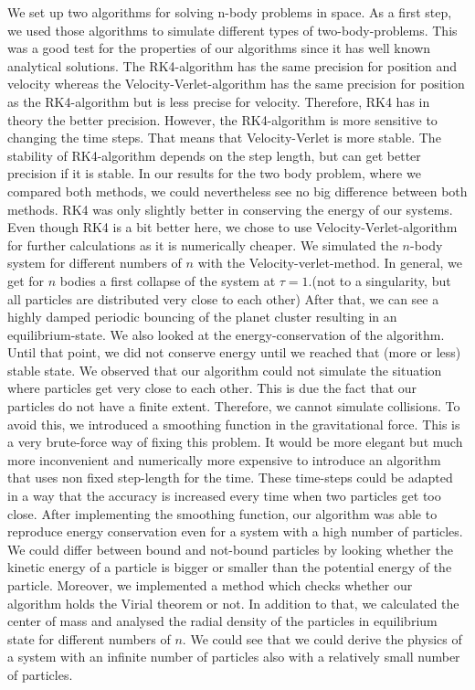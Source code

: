 \documentclass[10pt,a4paper]{article}
\begin{document}
We set up two algorithms for solving n-body problems in space. As a first step, we used those algorithms to simulate different types of two-body-problems. This was a good test for the properties of our algorithms since it has well known analytical solutions. 
The RK4-algorithm has the same precision for position and velocity whereas the Velocity-Verlet-algorithm has the same precision for position as the RK4-algorithm but is less precise for velocity. Therefore, RK4 has in theory the better precision. However, the RK4-algorithm is more sensitive to changing the time steps. That means that Velocity-Verlet is more stable. The stability of RK4-algorithm depends on the step length, but can get better precision if it is stable. In our results for the two body problem, where we compared both methods, we could nevertheless see no big difference between both methods. RK4 was only slightly better in conserving the energy of our systems.
Even though RK4 is a bit better here, we chose to use Velocity-Verlet-algorithm for further calculations as it is numerically cheaper. 
We simulated the $n$-body system for different numbers of $n$ with the Velocity-verlet-method. 
In general, we get for $n$ bodies a first collapse of the system at $\tau=1$.(not to a singularity, but all particles are distributed very close to each other) After that, we can see a highly damped periodic bouncing of the planet cluster resulting in an equilibrium-state. We also looked at the energy-conservation of the algorithm. Until that point, we did not conserve energy until we reached that (more or less) stable state.
We observed that our algorithm could not simulate the situation where particles get very close to each other. This is due the fact that our particles do not have a finite extent. Therefore, we cannot simulate collisions. To avoid this, we introduced a smoothing function in the gravitational force. This is a very brute-force way of fixing this problem. It would be more elegant but much more inconvenient and numerically more expensive to introduce an algorithm that uses non fixed step-length for the time. These time-steps could be adapted in a way that the accuracy is increased every time when two particles get too close.
After implementing the smoothing function, our algorithm was able to reproduce energy conservation even for a system with a high number of particles.
We could differ between bound and not-bound particles by looking whether the kinetic energy of a particle is bigger or smaller than the potential energy of the particle. Moreover, we implemented a method which checks whether our algorithm holds the Virial theorem or not. 
In addition to that, we calculated the center of mass and analysed the radial density of the particles in equilibrium state for different numbers of $n$. We could see that we could derive the physics of a system with an infinite number of particles also with a relatively small number of particles.
\end{document}
